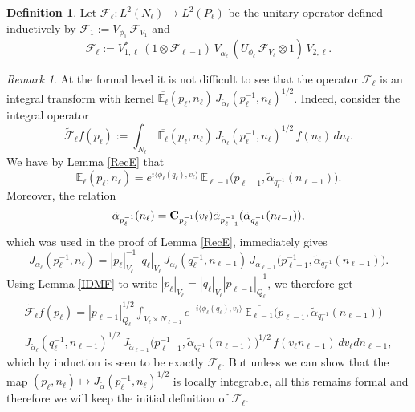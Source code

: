 \documentclass[a4paper,11pt,reqno]{amsart}
\numberwithin{equation}{section}
\theoremstyle{remark}
\newtheorem{remark}[theorem]{Remark}
\theoremstyle{definition}
\newtheorem{definition}[theorem]{Definition}
\newcommand{\F}{{\mathcal F}}
\newcommand{\E}{\mathbb E}
\begin{document}
\begin{definition}
\label{UFT}
Let $\F_\ell:L^2(N_\ell)\to L^2(P_\ell)$ be the unitary operator defined inductively by $\F_1:=V_{\phi_1}\,\F_{V_1}$ and
$$
\F_\ell:=V_{1,\ell}^*\,(1\otimes \F_{\ell-1})\,V_{\tilde\alpha_\ell}\,( U_{\phi_\ell}\,\F_{V_\ell}\otimes 1)\,V_{2,\ell}.
$$
\end{definition}
\begin{remark}
\label{FFD}
At  the formal level it is not difficult  to see that the  operator $\F_\ell$ is an integral transform with kernel
$ \overline{\E_\ell}(p_\ell ,n_\ell)\, J_{\tilde\alpha_\ell}(p_{\ell}^{-1},n_\ell)^{1/2}$.
Indeed, consider the integral operator
$$
\tilde\F_\ell f(p_\ell):=\int_{N_\ell}\, \overline{\E_\ell}(p_\ell ,n_\ell)\, J_{\tilde\alpha_\ell}(p_{\ell}^{-1},n_\ell)^{1/2}\,f(n_\ell)\,dn_\ell.
$$
We have by Lemma \ref{RecE} that
$$
\E_\ell(p_\ell ,n_\ell)=e^{i\langle \phi_\ell(q_\ell),v_\ell\rangle}\,\E_{\ell-1}\big(p_{\ell-1} ,\tilde\alpha_{q_\ell^{-1}}(n_{\ell-1})\big).
$$
Moreover, the relation
\begin{align}
\label{TRL}
\tilde\alpha_{ p_\ell^{-1}}(n_\ell)
={\bf C}_{ p_\ell^{-1}}(v_\ell)\tilde\alpha_{ p_{\ell-1}^{-1}}(\tilde\alpha_{q_\ell^{-1}}(n_{\ell-1})),
\end{align}
which was used in the proof of Lemma \ref{RecE}, immediately gives
$$
J_{\tilde\alpha_\ell}(p_{\ell}^{-1},n_\ell)=|p_\ell|^{-1}_{V_\ell}\,|q_\ell|_{V_\ell}\,J_{\tilde\alpha_\ell}(q_\ell^{-1},n_{\ell-1})\,
J_{\tilde\alpha_{\ell-1}}\big(p_{\ell-1}^{-1},\tilde\alpha_{q_\ell^{-1}}(n_{\ell-1})\big).
$$
Using Lemma \ref{IDMF} to write $|p_\ell|_{V_\ell}=|q_\ell|_{V_\ell}|p_{\ell-1}|_{Q_\ell}^{-1}$, we therefore get
\begin{multline*}
\tilde\F_\ell f(p_\ell)=|p_{\ell-1}|_{Q_\ell}^{1/2}\int_{V_\ell\times N_{\ell-1}} e^{-i\langle \phi_\ell(q_\ell),v_\ell\rangle}\,\overline{\E_{\ell-1}}\big(p_{\ell-1} ,\tilde\alpha_{q_\ell^{-1}}(n_{\ell-1})\big)\\
J_{\tilde\alpha_\ell}(q_\ell^{-1},n_{\ell-1})^{1/2}\,
J_{\tilde\alpha_{\ell-1}}\big(p_{\ell-1}^{-1},\tilde\alpha_{q_\ell^{-1}}(n_{\ell-1})\big)^{1/2}\,f(v_\ell n_{\ell-1})\,dv_\ell dn_{\ell-1},
\end{multline*}
which by induction is seen to be exactly $\F_\ell$.
But unless we can show that the map $(p_\ell ,n_\ell)\mapsto J_{\tilde\alpha}(p_{\ell}^{-1},n_\ell)^{1/2}$ is locally integrable, all this remains formal
and therefore we will  keep the initial definition of $\F_\ell$.
\end{remark}
\end{document}
